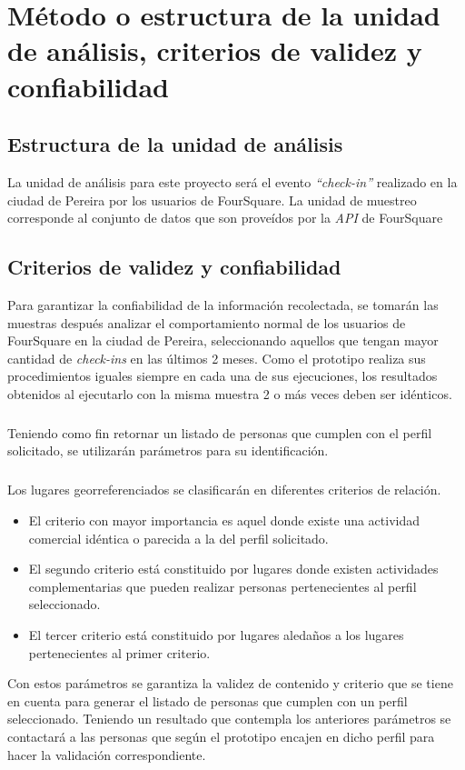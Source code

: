 \chapter{M\'etodo o estructura de la unidad de an\'alisis, criterios de validez y confiabilidad}
\label{sec:analisis}
\section{Estructura de la unidad de an\'alisis}
La unidad de an\'alisis para este proyecto ser\'a el evento \textit{“check-in”} realizado en la ciudad de Pereira por los usuarios de FourSquare. La unidad de muestreo corresponde al conjunto de datos que son prove\'idos por la \textit{API} de FourSquare
\section{Criterios de validez y confiabilidad}
Para garantizar la confiabilidad de la informaci\'on recolectada, se tomar\'an las muestras despu\'es analizar el comportamiento normal de los usuarios de FourSquare en la ciudad de Pereira, seleccionando aquellos que tengan mayor cantidad de \textit{check-ins} en las \'ultimos 2 meses. Como el prototipo realiza sus procedimientos iguales siempre en cada una de sus ejecuciones, los resultados obtenidos al ejecutarlo con la misma muestra 2 o m\'as veces deben ser id\'enticos.
\paragraph{}
Teniendo como fin retornar un listado de personas que cumplen con  el perfil solicitado, se utilizar\'an par\'ametros para su identificaci\'on.
\paragraph{}
Los lugares georreferenciados se clasificar\'an en diferentes criterios de relaci\'on.
\begin{itemize}
\item El criterio con mayor importancia es aquel donde existe una actividad comercial id\'entica o parecida a la del perfil solicitado. 
\item El segundo criterio est\'a constituido por lugares donde existen actividades complementarias que pueden realizar personas pertenecientes al perfil seleccionado.
\item El tercer criterio est\'a constituido por lugares aleda\~nos a los lugares pertenecientes al primer criterio.
\end{itemize}
Con estos par\'ametros se garantiza la validez de contenido y criterio que se tiene en cuenta para generar el listado de personas que cumplen con un perfil seleccionado. Teniendo un resultado que contempla los anteriores par\'ametros se contactar\'a a las personas que seg\'un el prototipo encajen en dicho perfil para hacer la validaci\'on correspondiente.
\pagebreak